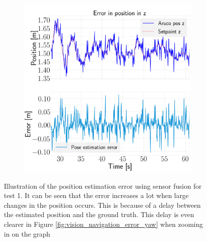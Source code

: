 \documentclass[../Head/report.tex]{subfiles}
\begin{document}
\begin{figure}[H]
\begin{subfigure}[t]{.30\textwidth}
        \caption{}
        \label{fig:vision_navigation_error_y}
    \end{subfigure}
     \hspace{0.2em}
    \begin{subfigure}[t]{.30\textwidth}
        \centering
        \includegraphics[width=\textwidth]{../Figures/vision_navigation/pose_error_z_test2.png}
        \caption{}
        \label{fig:vision_navigation_error_z}
    \end{subfigure}
    \caption{Illustration of the position estimation error using sensor fusion for test 1. It can be seen that the error increases a lot when large changes in the position occurs. This is because of a delay between the estimated position and the ground truth. This delay is even clearer in Figure \ref{fig:vision_navigation_error_yaw} when zooming in on the graph}
    \label{fig:vision_navigation_error_pos}
\end{figure}
\end{document}
